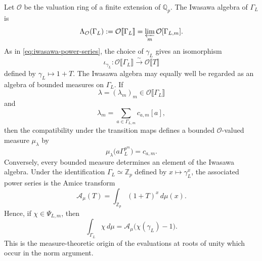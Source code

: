 \documentclass[11pt,table]{amsart}
\numberwithin{equation}{section}
\begin{document}
\par Let \(\mathcal O\) be the valuation ring of a finite extension of
\(\mathbb Q_p\).  The Iwasawa algebra of \(\Gamma_L\) is
\[
        \Lambda_{\mathcal O}(\Gamma_L)
        :=
        \mathcal O\llbracket\Gamma_L\rrbracket
        =
        \varprojlim_m
        \mathcal O[\Gamma_{L,m}].
\]
As in \eqref{eq:iwasawa-power-series}, the choice of \(\gamma_L\) gives an isomorphism
\begin{equation}
\label{eq:totally-real-iwasawa-power-series}
        \iota_{\gamma_L}:
        \mathcal O\llbracket\Gamma_L\rrbracket
        \xrightarrow{\;\sim\;}
        \mathcal O\llbracket T\rrbracket
\end{equation}
defined by $\gamma_L\mapsto1+T$. The Iwasawa algebra may equally well be regarded as an algebra
of bounded measures on \(\Gamma_L\).  If
\[
        \lambda=(\lambda_m)_m
        \in
        \mathcal O\llbracket\Gamma_L\rrbracket
\]
and
\[
        \lambda_m
        =
        \sum_{a\in\Gamma_{L,m}}
        c_{a,m}[a],
\]
then the compatibility under the transition maps defines a bounded
\(\mathcal O\)-valued measure \(\mu_\lambda\) by
\[
        \mu_\lambda
        \bigl(a\Gamma_L^{p^m}\bigr)
        =
        c_{a,m}.
\]
Conversely, every bounded measure determines an element of the Iwasawa
algebra.  Under the identification $\Gamma_L\simeq\mathbb Z_p$ defined by $x\mapsto\gamma_L^x$, the associated power series is the Amice transform
\[
        \mathcal A_\mu(T)
        =
        \int_{\mathbb Z_p}(1+T)^x\,d\mu(x).
\]
Hence, if \(\chi\in\Psi_{L,m}\), then
\[
        \int_{\Gamma_L}\chi\,d\mu
        =
        \mathcal A_\mu
        \bigl(\chi(\gamma_L)-1\bigr).
\]
This is the measure-theoretic origin of the evaluations at roots of
unity which occur in the norm argument.
\end{document}
